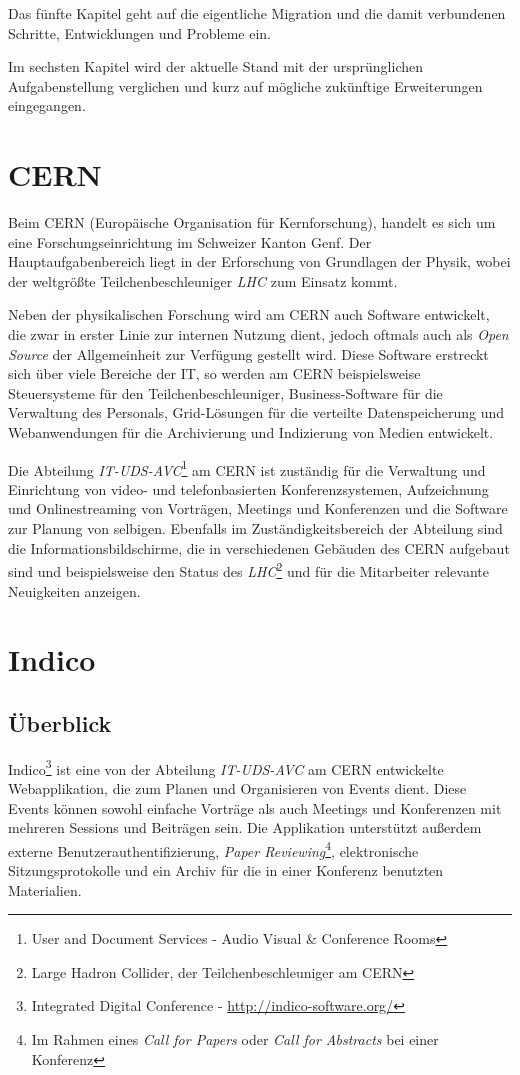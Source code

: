 Das fünfte Kapitel geht auf die eigentliche Migration und die damit verbundenen Schritte,
Entwicklungen und Probleme ein.

Im sechsten Kapitel wird der aktuelle Stand mit der ursprünglichen Aufgabenstellung verglichen und
kurz auf mögliche zukünftige Erweiterungen eingegangen.


\section{CERN}

Beim CERN (Europäische Organisation für Kernforschung), handelt es sich um eine
Forschungseinrichtung im Schweizer Kanton Genf. Der Hauptaufgabenbereich liegt in der Erforschung
von Grundlagen der Physik, wobei der weltgrößte Teilchenbeschleuniger \emph{LHC} zum Einsatz kommt.

Neben der physikalischen Forschung wird am CERN auch Software entwickelt, die zwar in erster Linie
zur internen Nutzung dient, jedoch oftmals auch als \emph{Open Source} der Allgemeinheit zur Verfügung
gestellt wird. Diese Software erstreckt sich über viele Bereiche der IT, so werden am CERN
beispielsweise Steuersysteme für den Teilchenbeschleuniger, Business-Software für die Verwaltung des
Personals, Grid-Lösungen für die verteilte Datenspeicherung und Webanwendungen für die Archivierung
und Indizierung von Medien entwickelt.

Die Abteilung \emph{IT-UDS-AVC}\footnote{User and Document Services - Audio Visual \& Conference
Rooms} am CERN ist zuständig für die Verwaltung und Einrichtung von video- und telefonbasierten
Konferenzsystemen, Aufzeichnung und Onlinestreaming von Vorträgen, Meetings und Konferenzen und die
Software zur Planung von selbigen. Ebenfalls im Zuständigkeitsbereich der Abteilung sind
die Informationsbildschirme, die in verschiedenen Gebäuden des CERN aufgebaut sind und beispielsweise
den Status des \emph{LHC}\footnote{Large Hadron Collider, der Teilchenbeschleuniger am CERN} und
für die Mitarbeiter relevante Neuigkeiten anzeigen.


\section{Indico}

\subsection{Überblick}
Indico\footnote{Integrated Digital Conference - \href{http://indico-software.org/}{http://indico-software.org/}}
ist eine von der Abteilung \emph{IT-UDS-AVC} am CERN entwickelte Webapplikation, die zum Planen und Organisieren von Events dient. Diese
Events können sowohl einfache Vorträge als auch Meetings und Konferenzen mit mehreren Sessions und
Beiträgen sein. Die Applikation unterstützt außerdem externe Benutzerauthentifizierung, \emph{Paper
Reviewing}\footnote{Im Rahmen eines \emph{Call for Papers} oder \emph{Call for Abstracts} bei einer
Konferenz}, elektronische Sitzungsprotokolle und ein Archiv für die in einer Konferenz benutzten
Materialien. \citep{indico}

